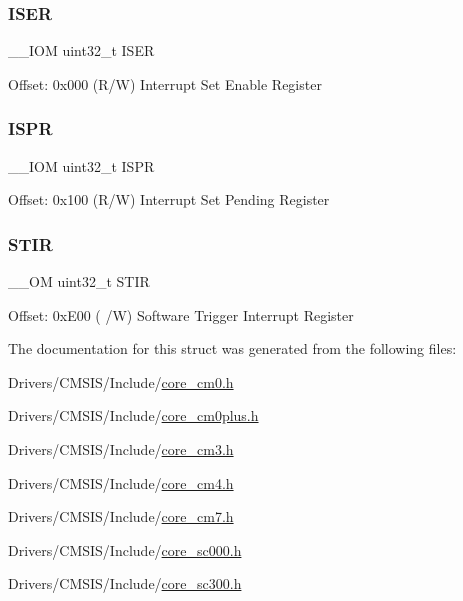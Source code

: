 \subsubsection{\texorpdfstring{I\+S\+ER}{ISER}}
{\footnotesize\ttfamily \+\_\+\+\_\+\+I\+OM uint32\+\_\+t I\+S\+ER}

Offset\+: 0x000 (R/W) Interrupt Set Enable Register \mbox{\label{struct_n_v_i_c___type_aecb96022a2971ea637c06798bd131e91}} 
\subsubsection{\texorpdfstring{I\+S\+PR}{ISPR}}
{\footnotesize\ttfamily \+\_\+\+\_\+\+I\+OM uint32\+\_\+t I\+S\+PR}

Offset\+: 0x100 (R/W) Interrupt Set Pending Register \mbox{\label{struct_n_v_i_c___type_ada9cbba14ab1cc3fddd585f870932db8}} 
\subsubsection{\texorpdfstring{S\+T\+IR}{STIR}}
{\footnotesize\ttfamily \+\_\+\+\_\+\+OM uint32\+\_\+t S\+T\+IR}

Offset\+: 0x\+E00 ( /W) Software Trigger Interrupt Register 

The documentation for this struct was generated from the following files\+:\begin{DoxyCompactItemize}
\item 
Drivers/\+C\+M\+S\+I\+S/\+Include/\mbox{\hyperlink{core__cm0_8h}{core\+\_\+cm0.\+h}}\item 
Drivers/\+C\+M\+S\+I\+S/\+Include/\mbox{\hyperlink{core__cm0plus_8h}{core\+\_\+cm0plus.\+h}}\item 
Drivers/\+C\+M\+S\+I\+S/\+Include/\mbox{\hyperlink{core__cm3_8h}{core\+\_\+cm3.\+h}}\item 
Drivers/\+C\+M\+S\+I\+S/\+Include/\mbox{\hyperlink{core__cm4_8h}{core\+\_\+cm4.\+h}}\item 
Drivers/\+C\+M\+S\+I\+S/\+Include/\mbox{\hyperlink{core__cm7_8h}{core\+\_\+cm7.\+h}}\item 
Drivers/\+C\+M\+S\+I\+S/\+Include/\mbox{\hyperlink{core__sc000_8h}{core\+\_\+sc000.\+h}}\item 
Drivers/\+C\+M\+S\+I\+S/\+Include/\mbox{\hyperlink{core__sc300_8h}{core\+\_\+sc300.\+h}}\end{DoxyCompactItemize}
